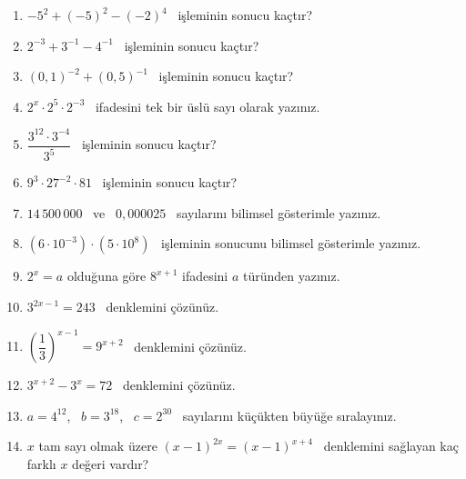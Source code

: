\begin{enumerate}[label=\textbf{\arabic*.},leftmargin=*,itemsep=6pt]
\item \(-5^2+(-5)^2-(-2)^4\) \ işleminin sonucu kaçtır?
\item \(2^{-3}+3^{-1}-4^{-1}\) \ işleminin sonucu kaçtır?
\item \((0{,}1)^{-2}+(0{,}5)^{-1}\) \ işleminin sonucu kaçtır?
\item \(2^x\cdot 2^5\cdot 2^{-3}\) \ ifadesini tek bir üslü sayı olarak yazınız.
\item \(\dfrac{3^{12}\cdot 3^{-4}}{3^5}\) \ işleminin sonucu kaçtır?
\item \(9^3\cdot 27^{-2}\cdot 81\) \ işleminin sonucu kaçtır?
\item \(14\,500\,000\) \ ve \ \(0{,}000025\) \ sayılarını bilimsel gösterimle yazınız.
\item \((6\cdot 10^{-3})\cdot(5\cdot 10^{8})\) \ işleminin sonucunu bilimsel gösterimle yazınız.
\item \(2^x=a\) olduğuna göre \(8^{x+1}\) ifadesini \(a\) türünden yazınız.
\item \(3^{2x-1}=243\) \ denklemini çözünüz.
\item \(\left(\dfrac13\right)^{x-1}=9^{x+2}\) \ denklemini çözünüz.
\item \(3^{x+2}-3^{x}=72\) \ denklemini çözünüz.
\item \(a=4^{12}\), \ \(b=3^{18}\), \ \(c=2^{30}\) \ sayılarını küçükten büyüğe sıralayınız.
\item \(x\) tam sayı olmak üzere \((x-1)^{2x}=(x-1)^{x+4}\) \ denklemini sağlayan kaç farklı \(x\) değeri vardır?
\end{enumerate}

